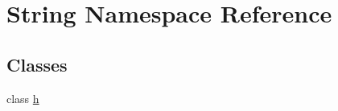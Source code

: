 \hypertarget{namespace_string}{}\section{String Namespace Reference}
\label{namespace_string}
\subsection*{Classes}
\begin{DoxyCompactItemize}
\item 
class \hyperlink{class_string_1_1h}{h}
\end{DoxyCompactItemize}
